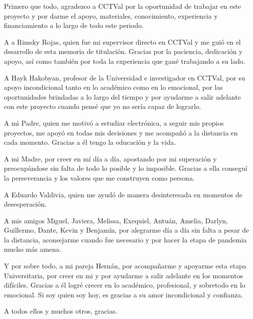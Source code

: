 
Primero que todo, agradezco a CCTVal por la oportunidad de trabajar en este proyecto y por darme el apoyo, materiales, conocimiento, experiencia y financiamiento a lo largo de todo este periodo.

A a Rimsky Rojas, quien fue mi supervisor directo en CCTVal y me guió en el desarrollo de esta memoria de titulación. Gracias por la paciencia, dedicación y apoyo, así como también por toda la experiencia que gané trabajando a su lado.
 
A Hayk Hakobyan, profesor de la Universidad e investigador en CCTVal, por su apoyo incondicional tanto en lo académico como en lo emocional, por las oportunidades brindadas a lo largo del tiempo y por ayudarme a salir adelante con este proyecto cuando pensé que yo no sería capaz de lograrlo.

A mi Padre, quien me motivó a estudiar electrónica, a seguir mis propios proyectos, me apoyó en todas mis decisiones y me acompañó a la distancia en cada momento. Gracias a él tengo la educación y la vida.

A mi Madre, por creer en mí día a día, apostando por mi superación y preocupándose sin falta de todo lo posible y lo imposible. Gracias a ella conseguí la perseverancia y los valores que me construyen como persona.

A Eduardo Valdivia, quien me ayudó de manera desinteresada en momentos de desesperación.

A mis amigos Miguel, Javiera, Melissa, Exequiel, Antuán,  Amelia, Darlyn, Guillermo, Dante, Kevin y Benjamín, por alegrarme día a día sin falta a pesar de la distancia, aconsejarme cuando fue necesario y por hacer la etapa de pandemia mucho más amena.

Y por sobre todo, a mi pareja Hernán, por acompañarme y apoyarme esta etapa Universitaria, por creer en mi y por ayudarme a salir adelante en los momentos difíciles. Gracias a él logré crecer en lo académico, profesional, y sobretodo en lo emocional. Si soy quien soy hoy, es gracias a su amor incondicional y confianza.\\

\begin{flushright}
	A todos ellos y muchos otros, gracias.
\end{flushright}
